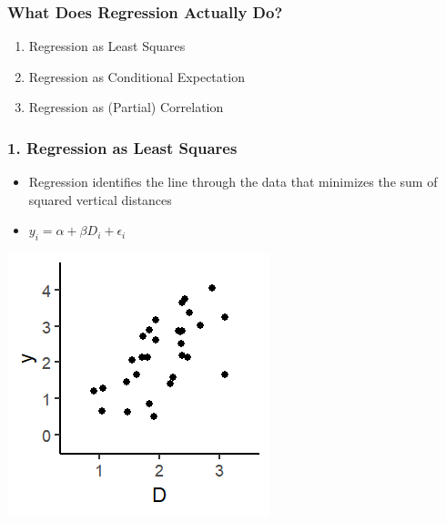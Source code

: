 \documentclass[xcolor=x11names,compress]{beamer}\usepackage[]{graphicx}\usepackage[]{color}
\makeatletter
\def\maxwidth{ %
  \ifdim\Gin@nat@width>\linewidth
    \linewidth
  \else
    \Gin@nat@width
  \fi
}
\newenvironment{knitrout}{}{} %
\renewcommand{\(}{\begin{columns}}
\renewcommand{\)}{\end{columns}}
\newcommand{\<}[1]{\begin{column}{#1}}
\renewcommand{\>}{\end{column}}
\makeatother
\begin{document}
\begin{frame}
\frametitle{What Does Regression Actually Do?}
\begin{enumerate}
\item Regression as Least Squares
\item Regression as Conditional Expectation
\item Regression as (Partial) Correlation
\end{enumerate}
\end{frame}


\begin{frame}
\frametitle{1. Regression as Least Squares}
\begin{itemize}
\item Regression identifies the line through the data that minimizes the sum of squared vertical distances 
\pause
\item $y_i = \alpha + \beta D_i + \epsilon_i$
\pause
\end{itemize}
\begin{multicols}{2}
\begin{knitrout}
\color{fgcolor}
\includegraphics[width=\maxwidth]{figure/graph_ols0-1} 

\end{knitrout}
\columnbreak
 
\end{multicols}
\end{frame}
\end{document}
